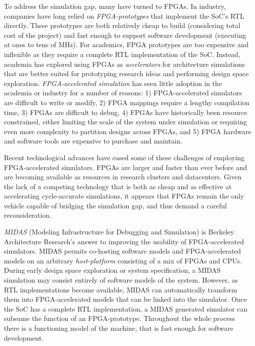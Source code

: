 To address the simulation gap, many have turned to FPGAs. In industry,
companies have long relied on \emph{FPGA-prototypes} that implement the SoC's
RTL directly. These prototypes are both relatively cheap to build (considering
total cost of the project) and fast enough to support software development
(executing at ones to tens of MHz). For academics, FPGA prototypes are too
expensive and inflexible as they require a complete RTL implementation of the
SoC. Instead, academia has explored using FPGAs as \emph{accelerators} for
architecture simulations~\cite{fast, fame, hasim, protoflex,ramp} that are
better suited for prototyping research ideas and performing design space
exploration. \emph{FPGA-accelerated simulation} has seen little adoption in the
academia or industry for a number of reasons: 1) FPGA-accelerated simulators
are difficult to write or modify, 2) FPGA mappings require a lengthy
compilation time, 3) FPGAs are difficult to debug, 4) FPGAs have historically
been resource constrained, either limiting the scale of the system under
simulation or requiring even more complexity to partition designs across FPGAs,
and 5) FPGA hardware and software tools are expensive to purchase and maintain.

Recent technological advances have eased some of these challenges of employing
FPGA-accelerated simulators. FPGAs are larger and faster than ever before and
are becoming available as resources in research clusters\cite{catapultannounce}
and datacenters\cite{amazonf1}.  Given the lack of a competing technology that
is both as cheap and as effective at accelerating cycle-accurate simulations,
it appears that FPGAs remain the only vehicle capable of bridging the
simulation gap, and thus demand a careful reconsideration.

\emph{MIDAS} (Modeling Infrastructure for Debugging and Simulation) is Berkeley
Architecture Research's answer to improving the usability of FPGA-accelerated
simulators. MIDAS permits co-hosting software models and FPGA-accelerated
models on an arbitrary \emph{host-platform} consisting of a mix of FPGAs and
CPUs.  During early design space exploration or system specification, a MIDAS
simulation may consist entirely of software models of the system.  However, as
RTL implementations become available, MIDAS can automatically transform them
into FPGA-accelerated models that can be linked into the simulator. Once the
SoC has a complete RTL implementation, a MIDAS generated simulator can subsume
the function of an FPGA-prototype. Throughout the whole process there is a
functioning model of the machine, that is fast enough for software development.

